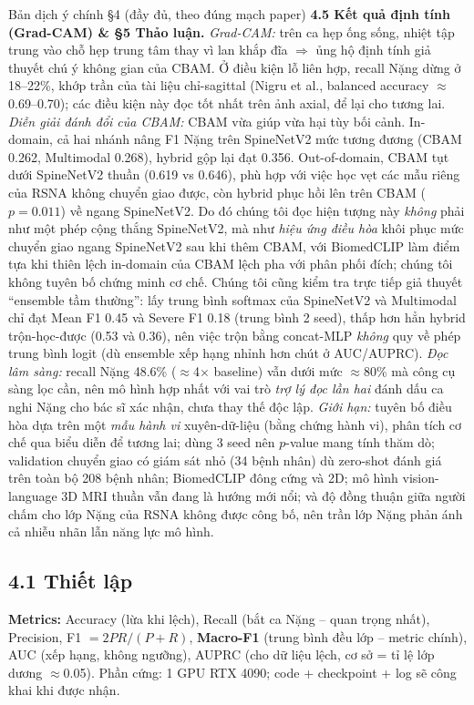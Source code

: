 \documentclass[12pt,a4paper]{article}
\begin{document}
\begin{dichbox}{Bản dịch ý chính §4 (đầy đủ, theo đúng mạch paper)}
\textbf{4.5 Kết quả định tính (Grad-CAM) \& §5 Thảo luận.}
\emph{Grad-CAM:} trên ca hẹp ống sống, nhiệt tập trung vào chỗ hẹp trung tâm thay vì lan khắp đĩa $\Rightarrow$ ủng hộ định tính giả thuyết chú ý không gian của CBAM. Ở điều kiện lỗ liên hợp, recall Nặng dừng ở 18--22\%, khớp trần của tài liệu chỉ-sagittal (Nigru et al., balanced accuracy $\approx$0.69--0.70); các điều kiện này đọc tốt nhất trên ảnh axial, để lại cho tương lai. \emph{Diễn giải đánh đổi của CBAM:} CBAM vừa giúp vừa hại tùy bối cảnh. In-domain, cả hai nhánh nâng F1 Nặng trên SpineNetV2 mức tương đương (CBAM 0.262, Multimodal 0.268), hybrid gộp lại đạt 0.356. Out-of-domain, CBAM tụt dưới SpineNetV2 thuần (0.619 vs 0.646), phù hợp với việc học vẹt các mẫu riêng của RSNA không chuyển giao được, còn hybrid phục hồi lên trên CBAM ($p=0.011$) về ngang SpineNetV2. Do đó chúng tôi đọc hiện tượng này \emph{không} phải như một phép cộng thắng SpineNetV2, mà như \emph{hiệu ứng điều hòa} khôi phục mức chuyển giao ngang SpineNetV2 sau khi thêm CBAM, với BiomedCLIP làm điểm tựa khi thiên lệch in-domain của CBAM lệch pha với phân phối đích; chúng tôi không tuyên bố chứng minh cơ chế. Chúng tôi cũng kiểm tra trực tiếp giả thuyết ``ensemble tầm thường'': lấy trung bình softmax của SpineNetV2 và Multimodal chỉ đạt Mean F1 0.45 và Severe F1 0.18 (trung bình 2 seed), thấp hơn hẳn hybrid trộn-học-được (0.53 và 0.36), nên việc trộn bằng concat-MLP \emph{không} quy về phép trung bình logit (dù ensemble xếp hạng nhỉnh hơn chút ở AUC/AUPRC). \emph{Đọc lâm sàng:} recall Nặng 48.6\% ($\approx$4$\times$ baseline) vẫn dưới mức $\approx$80\% mà công cụ sàng lọc cần, nên mô hình hợp nhất với vai trò \emph{trợ lý đọc lần hai} đánh dấu ca nghi Nặng cho bác sĩ xác nhận, chưa thay thế độc lập. \emph{Giới hạn:} tuyên bố điều hòa dựa trên một \emph{mẫu hành vi} xuyên-dữ-liệu (bằng chứng hành vi), phân tích cơ chế qua biểu diễn để tương lai; dùng 3 seed nên $p$-value mang tính thăm dò; validation chuyển giao có giám sát nhỏ (34 bệnh nhân) dù zero-shot đánh giá trên toàn bộ 208 bệnh nhân; BiomedCLIP đông cứng và 2D; mô hình vision-language 3D MRI thuần vẫn đang là hướng mới nổi; và độ đồng thuận giữa người chấm cho lớp Nặng của RSNA không được công bố, nên trần lớp Nặng phản ánh cả nhiễu nhãn lẫn năng lực mô hình.
\end{dichbox}

\subsection{4.1 Thiết lập}
\textbf{Metrics:} Accuracy (lừa khi lệch), Recall (bắt ca Nặng -- quan trọng nhất), Precision, F1 $=2PR/(P{+}R)$, \textbf{Macro-F1} (trung bình đều lớp -- metric chính), AUC (xếp hạng, không ngưỡng), AUPRC (cho dữ liệu lệch, cơ sở = tỉ lệ lớp dương $\approx$0.05). Phần cứng: 1 GPU RTX 4090; code + checkpoint + log sẽ công khai khi được nhận.
\end{document}
